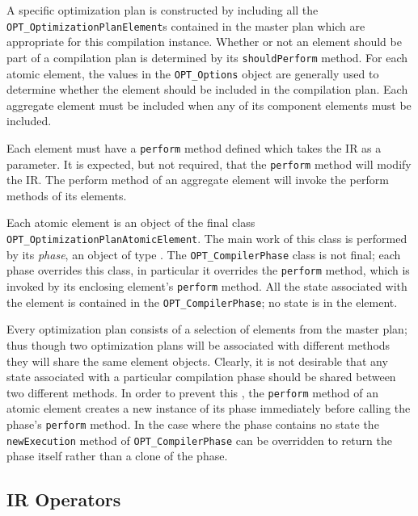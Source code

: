 A specific optimization plan is constructed by including all the 
{\tt OPT\_OptimizationPlanElement}s contained in the master plan which are 
appropriate for this compilation instance. 
Whether or not an element should be part of a compilation plan is determined 
by its {\tt shouldPerform} method. For each atomic element, the values in the
{\tt OPT\_Options} object are generally used to determine whether the element
should be included in the compilation plan. Each aggregate element must be 
included when any of its component elements must be included. 

Each element must have a {\tt perform} method defined which takes the IR as
a parameter. It is expected, but not required, that the {\tt perform}
method will modify the IR. 
The perform method of an aggregate element will invoke the 
perform methods of its elements.

Each atomic element is an object of the final class 
{\tt OPT\_OptimizationPlanAtomicElement}. The main work of this class
is performed by its {\em phase}, an object of type 
. The
{\tt OPT\_CompilerPhase} class is not final; each phase overrides this class,
in particular it overrides the {\tt perform} method, which is invoked by its 
enclosing element's {\tt perform} method. All the state associated with 
the element
is contained in the {\tt OPT\_CompilerPhase}; no
state is in the element.

Every optimization plan consists of a selection of elements from the master 
plan;
thus though two optimization plans will be associated with different methods 
they
will share the same element objects. Clearly, it is not desirable that any state
associated with a particular compilation phase should be shared between two
different methods. In order to prevent this , the {\tt perform}
method of an atomic element creates a new instance of its phase immediately 
before calling the phase's {\tt perform} method. In the case where the phase
contains no state the {\tt newExecution} method of 
{\tt OPT\_CompilerPhase} can be overridden to return the phase itself rather 
than a clone of the phase.

\subsection{IR Operators}

